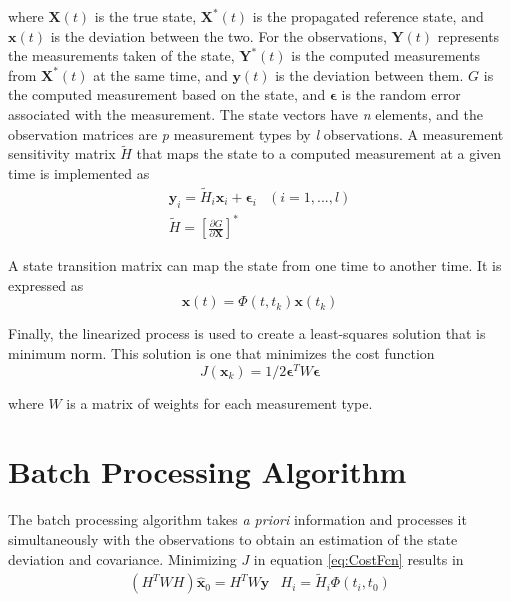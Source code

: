 \documentclass[]{aiaa-tc}%
\begin{document}
	\noindent where $\mathbf{X}(t)$ is the true state, $\mathbf{X}^{*}(t)$ is the propagated reference state, and $\mathbf{x}(t)$ is the deviation between the two. For the observations, $\mathbf{Y}(t)$ represents the measurements taken of the state, $\mathbf{Y}^{*}(t)$ is the computed measurements from $\mathbf{X}^{*}(t)$ at the same time, and $\mathbf{y}(t)$ is the deviation between them. $G$ is the computed measurement based on the state, and $\boldsymbol{\epsilon}$ is the random error associated with the measurement.  The state vectors have \textit{n} elements, and the observation matrices are \textit{p} measurement types by \textit{l} observations.  A measurement sensitivity matrix $\tilde{H}$ that maps the state to a computed measurement at a given time is implemented as
	\begin{equation}
	\begin{matrix}
	\mathbf{y}_i=\tilde{H}_i\mathbf{x}_i+\boldsymbol{\epsilon}_i & (i=1,...,l) \\
	\tilde{H} = [\frac{\partial G}{\partial \mathbf{X}}]^{*}
	\end{matrix}
	\end{equation}

	A state transition matrix can map the state from one time to another time. It is expressed as
	\begin{equation}
	\mathbf{x}(t)=\Phi(t,t_k)\mathbf{x}(t_k)
	\end{equation}
	
	\vspace{5 mm}

	Finally, the linearized process is used to create a least-squares solution that is minimum norm. This solution is one that minimizes the cost function
	\begin{equation} \label{eq:CostFcn}
	J(\mathbf{x}_k)=1/2\boldsymbol{\epsilon}^TW\boldsymbol{\epsilon}
	\end{equation}

	\noindent where $W$ is a matrix of weights for each measurement type. 
	
	\section{Batch Processing Algorithm}
	
	The batch processing algorithm takes \textit{a priori} information and processes it simultaneously with the observations to obtain an estimation of the state deviation and covariance. Minimizing $J$ in equation \ref{eq:CostFcn} results in 
	\begin{equation} \label{eq:BLS}
	\begin{matrix}
	(H^TWH)\hat{\mathbf{x}}_0=H^TW\mathbf{y} & H_i=\tilde{H}_i\Phi(t_i,t_0)
	\end{matrix}
	\end{equation}
\end{document}
